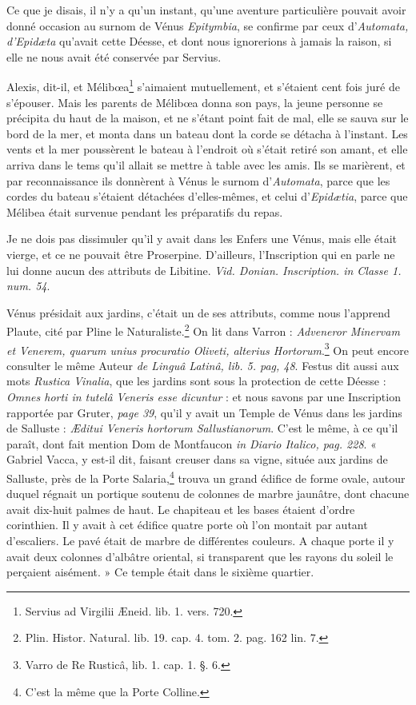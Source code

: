 \documentclass[a4paper, 11pt, oneside, polutonikogreek, french]{article}
\begin{document}
Ce que je disais, il n'y a qu'un instant, qu'une aventure particulière pouvait avoir donné occasion au surnom de Vénus \emph{Epitymbia}, se confirme par ceux d'\emph{Automata, d'Epidæta} qu'avait cette Déesse, et dont nous ignorerions à jamais la raison, si elle ne nous avait été conservée par Servius.

Alexis, dit-il, et Mélibœa\footnote{Servius ad Virgilii Æneid. lib. 1. vers. 720.} s'aimaient mutuellement, et s'étaient cent fois juré de s'épouser. Mais les parents de Mélibœa donna son pays, la jeune personne se précipita du haut de la maison, et ne s'étant point fait de mal, elle se sauva sur le bord de la mer, et monta dans un bateau dont la corde se détacha à l'instant. Les vents et la mer poussèrent le bateau à l'endroit où s'était retiré son amant, et elle arriva dans le tems qu'il allait se mettre à table avec les amis. Ils se marièrent, et par reconnaissance ils donnèrent à Vénus le surnom d'\emph{Automata}, parce que les cordes du bateau s'étaient détachées d'elles-mêmes, et celui d'\emph{Epidætia}, parce que Mélibea était survenue pendant les préparatifs du repas.

Je ne dois pas dissimuler qu'il y avait dans les Enfers une Vénus, mais elle était vierge, et ce ne pouvait être Proserpine. D'ailleurs, l'Inscription qui en parle ne lui donne aucun des attributs de Libitine. \emph{Vid. Donian. Inscription. in Classe 1. num. 54}.

Vénus présidait aux jardins, c'était un de ses attributs, comme nous l'apprend Plaute, cité par Pline le Naturaliste.\footnote{Plin. Histor. Natural. lib. 19. cap. 4. tom. 2. pag. 162 lin. 7.} On lit dans Varron : \emph{Adveneror Minervam et Venerem, quarum unius procuratio Oliveti, alterius Hortorum}.\footnote{Varro de Re Rusticâ, lib. 1. cap. 1. §. 6.} On peut encore consulter le même Auteur \emph{de Linguâ Latinâ, lib. 5. pag, 48}. Festus dit aussi aux mots \emph{Rustica Vinalia}, que les jardins sont sous la protection de cette Déesse : \emph{Omnes horti in tutelâ Veneris esse dicuntur} : et nous savons par une Inscription rapportée par Gruter, \emph{page 39}, qu'il y avait un Temple de Vénus dans les jardins de Salluste : \emph{Æditui Veneris hortorum Sallustianorum}. C'est le même, à ce qu'il paraît, dont fait mention Dom de Montfaucon \emph{in Diario Italico, pag. 228}. « Gabriel Vacca, y est-il dit, faisant creuser dans sa vigne, située aux jardins de Salluste, près de la Porte Salaria,\footnote{C'est la même que la Porte Colline.} trouva un grand édifice de forme ovale, autour duquel régnait un portique soutenu de colonnes de marbre jaunâtre, dont chacune avait dix-huit palmes de haut. Le chapiteau et les bases étaient d'ordre corinthien. Il y avait à cet édifice quatre porte où l'on montait par autant d'escaliers. Le pavé était de marbre de différentes couleurs. A chaque porte il y avait deux colonnes d'albâtre oriental, si transparent que les rayons du soleil le perçaient aisément. » Ce temple était dans le sixième quartier.
\end{document}
